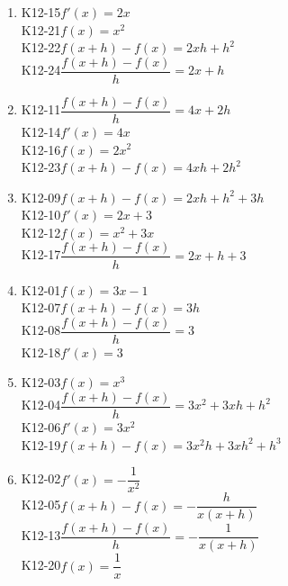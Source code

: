 \documentclass[11pt,a4paper]{article}
\begin{document}
\begin{enumerate}[leftmargin=1.6em, itemsep=0.7em]
\item \begin{minipage}[t]{\linewidth}\textsf{\small K12-15}\quad $f'(x) = 2x$ \\ \textsf{\small K12-21}\quad $f(x) = x^2$ \\ \textsf{\small K12-22}\quad $f(x + h) - f(x) = 2xh + h^2$ \\ \textsf{\small K12-24}\quad $\dfrac{f(x + h) - f(x)}{h} = 2x + h$\end{minipage}
\item \begin{minipage}[t]{\linewidth}\textsf{\small K12-11}\quad $\dfrac{f(x + h) - f(x)}{h} = 4x + 2h$ \\ \textsf{\small K12-14}\quad $f'(x) = 4x$ \\ \textsf{\small K12-16}\quad $f(x) = 2x^2$ \\ \textsf{\small K12-23}\quad $f(x + h) - f(x) = 4xh + 2h^2$\end{minipage}
\item \begin{minipage}[t]{\linewidth}\textsf{\small K12-09}\quad $f(x + h) - f(x) = 2xh + h^2 + 3h$ \\ \textsf{\small K12-10}\quad $f'(x) = 2x + 3$ \\ \textsf{\small K12-12}\quad $f(x) = x^2 + 3x$ \\ \textsf{\small K12-17}\quad $\dfrac{f(x + h) - f(x)}{h} = 2x + h + 3$\end{minipage}
\item \begin{minipage}[t]{\linewidth}\textsf{\small K12-01}\quad $f(x) = 3x - 1$ \\ \textsf{\small K12-07}\quad $f(x + h) - f(x) = 3h$ \\ \textsf{\small K12-08}\quad $\dfrac{f(x + h) - f(x)}{h} = 3$ \\ \textsf{\small K12-18}\quad $f'(x) = 3$\end{minipage}
\item \begin{minipage}[t]{\linewidth}\textsf{\small K12-03}\quad $f(x) = x^3$ \\ \textsf{\small K12-04}\quad $\dfrac{f(x + h) - f(x)}{h} = 3x^2 + 3xh + h^2$ \\ \textsf{\small K12-06}\quad $f'(x) = 3x^2$ \\ \textsf{\small K12-19}\quad $f(x + h) - f(x) = 3x^2h + 3xh^2 + h^3$\end{minipage}
\item \begin{minipage}[t]{\linewidth}\textsf{\small K12-02}\quad $f'(x) = -\dfrac{1}{x^2}$ \\ \textsf{\small K12-05}\quad $f(x + h) - f(x) = -\dfrac{h}{x(x + h)}$ \\ \textsf{\small K12-13}\quad $\dfrac{f(x + h) - f(x)}{h} = -\dfrac{1}{x(x + h)}$ \\ \textsf{\small K12-20}\quad $f(x) = \dfrac{1}{x}$\end{minipage}
\end{enumerate}
\end{document}
